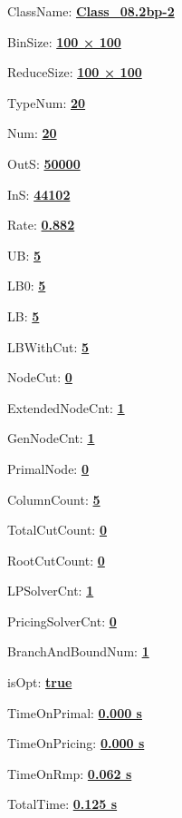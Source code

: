 \documentclass[11pt]{article}
\begin{document}
\pagestyle{empty}


ClassName: \underline{\textbf{Class_08.2bp-2}}
\par
BinSize: \underline{\textbf{100 × 100}}
\par
ReduceSize: \underline{\textbf{100 × 100}}
\par
TypeNum: \underline{\textbf{20}}
\par
Num: \underline{\textbf{20}}
\par
OutS: \underline{\textbf{50000}}
\par
InS: \underline{\textbf{44102}}
\par
Rate: \underline{\textbf{0.882}}
\par
UB: \underline{\textbf{5}}
\par
LB0: \underline{\textbf{5}}
\par
LB: \underline{\textbf{5}}
\par
LBWithCut: \underline{\textbf{5}}
\par
NodeCut: \underline{\textbf{0}}
\par
ExtendedNodeCnt: \underline{\textbf{1}}
\par
GenNodeCnt: \underline{\textbf{1}}
\par
PrimalNode: \underline{\textbf{0}}
\par
ColumnCount: \underline{\textbf{5}}
\par
TotalCutCount: \underline{\textbf{0}}
\par
RootCutCount: \underline{\textbf{0}}
\par
LPSolverCnt: \underline{\textbf{1}}
\par
PricingSolverCnt: \underline{\textbf{0}}
\par
BranchAndBoundNum: \underline{\textbf{1}}
\par
isOpt: \underline{\textbf{true}}
\par
TimeOnPrimal: \underline{\textbf{0.000 s}}
\par
TimeOnPricing: \underline{\textbf{0.000 s}}
\par
TimeOnRmp: \underline{\textbf{0.062 s}}
\par
TotalTime: \underline{\textbf{0.125 s}}
\par
\newpage


\end{document}

